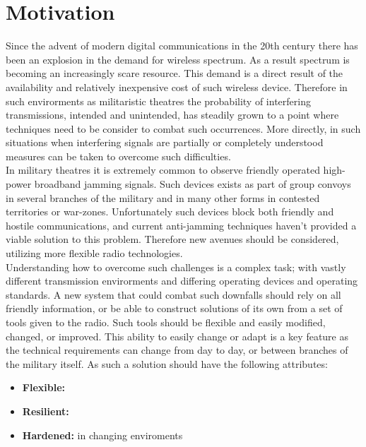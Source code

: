 \section{Motivation}

Since the advent of modern digital communications in the 20th century there has been an explosion in the demand for wireless spectrum.  As a result spectrum is becoming an increasingly scare resource\cite{scarcity}.  This demand is a direct result of the availability and relatively inexpensive cost of such wireless device.  Therefore in such envirorments as militaristic theatres the probability of interfering transmissions, intended and unintended, has steadily grown to a point where techniques need to be consider to combat such occurrences.  More directly, in such situations when interfering signals are partially or completely understood measures can be taken to overcome such difficulties.\\

In military theatres it is extremely common to observe friendly operated high-power broadband jamming signals\cite{frater}.  Such devices exists as part of group convoys in several branches of the military and in many other forms in contested territories or war-zones.  Unfortunately such devices block both friendly and hostile communications, and current anti-jamming techniques haven't provided a viable solution to this problem.  Therefore new avenues should be considered, utilizing more flexible radio technologies.\\

Understanding how to overcome such challenges is a complex task; with vastly different transmission envirorments and differing operating devices and operating standards.  A new system that could combat such downfalls should rely on all friendly information, or be able to construct solutions of its own from a set of tools given to the radio.  Such tools should be flexible and easily modified, changed, or improved.  This ability to easily change or adapt is a key feature as the technical requirements can change from day to day, or between branches of the military itself. As such a solution should have the following attributes:

\begin{itemize}
\item \textbf{Flexible:}

\item \textbf{Resilient:}

\item \textbf{Hardened:} in changing enviroments

\end{itemize}


